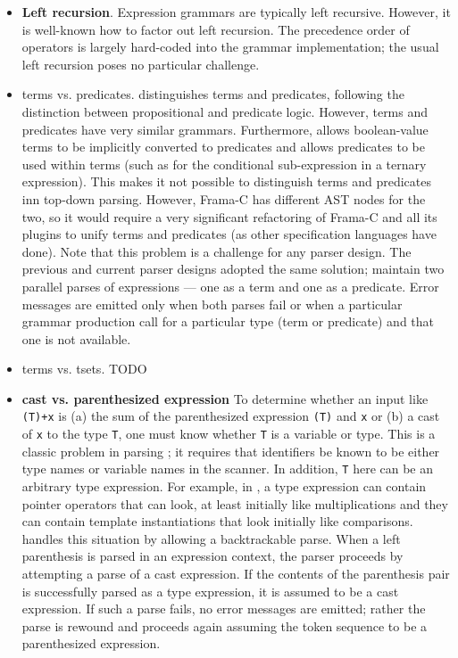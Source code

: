 \begin{itemize}
\item \textbf{Left recursion}. Expression grammars are typically left recursive. However, it is well-known how to factor out left recursion. The precedence order of operators is largely hard-coded into the grammar implementation; the usual left recursion poses no particular challenge.
\item {terms vs. predicates}. \acslpp distinguishes terms and predicates, following the distinction between propositional and predicate logic. However, terms and predicates have very similar grammars. Furthermore, \acslpp allows boolean-value terms to be implicitly converted to predicates and allows predicates to be used within terms (such as for the conditional sub-expression in a ternary expression). This makes it not possible to distinguish terms and predicates inn top-down parsing. However, Frama-C has different AST nodes for the two, so it would require a very significant refactoring of Frama-C and all its plugins to unify terms and predicates (as other specification languages have done). Note that this problem is a challenge for any parser design. The previous and current parser designs adopted the same solution; maintain two parallel parses of expressions --- one as a term and one as a predicate. Error messages are emitted only when both parses fail or when a particular grammar production call for a particular type (term or predicate) and that one is not available.
\item{terms vs. tsets}. TODO
\item \textbf{cast vs. parenthesized expression} To determine whether an input like \lstinline|(T)+x| is (a) the sum of the parenthesized expression \lstinline|(T)| and \lstinline|x| or (b) a cast of \lstinline|x| to the type \lstinline|T|, one must know whether \lstinline|T| is a variable or type. This is a classic problem in parsing \lang; it requires that identifiers be known to be either type names or variable names in the scanner. In addition, \lstinline|T| here can be an arbitrary type expression. For example, in \lang, a type expression can contain pointer operators that can look, at least initially like multiplications and they can contain template instantiations that look initially like comparisons. \fclang handles this situation by allowing a backtrackable parse. When a left parenthesis is parsed in an expression context, the parser proceeds by attempting a parse of a cast expression. If the contents of the parenthesis pair is successfully parsed as a type expression, it is assumed to be a cast expression. If such a parse fails, no error messages are emitted; rather the parse is rewound and proceeds again assuming the token sequence to be a parenthesized expression.

\end{itemize}
